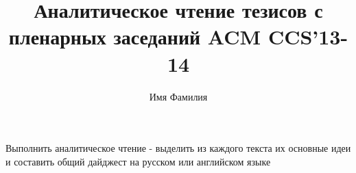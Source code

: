 \documentclass[10pt,a4paper]{article}
\author{Имя Фамилия}
\title{Аналитическое чтение тезисов с пленарных заседаний ACM CCS'13-14}
\begin{document}
\maketitle
Выполнить аналитическое чтение - выделить из каждого текста их основные идеи и составить общий дайджест на русском или английском языке
\end{document}
